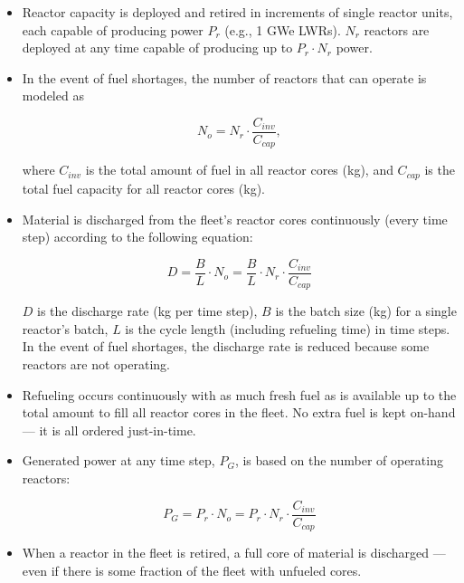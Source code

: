 \documentclass{style}
\begin{document}
\begin{itemize}

    \item Reactor capacity is deployed and retired in increments of single
      reactor units, each capable of producing power $P_r$ (e.g., 1 GWe
      LWRs).  $N_{r}$ reactors are deployed at any time capable of producing
      up to $P_r \cdot N_r$ power.

    \item In the event of fuel shortages, the number of reactors that can
      operate is modeled as

      \begin{equation}
        N_{o} = N_{r} \cdot \frac{C_{inv}}{C_{cap}},
        \label{eqn:operating-reactors}
      \end{equation}

       where $C_{inv}$ is the total amount of fuel in all reactor cores (kg),
       and $C_{cap}$ is the total fuel capacity for all reactor cores (kg).

    \item Material is discharged from the fleet's reactor cores continuously
        (every time step) according to the following equation:

        \begin{equation}
            D =
            \frac{B}{L} \cdot N_{o} =  \frac{B}{L} \cdot N_{r}\cdot \frac{C_{inv}}{C_{cap}}
            \label{eqn:fleet-discharge}
        \end{equation}

        $D$ is the discharge rate (kg per time step), $B$ is the batch size
        (kg) for a single reactor's batch, $L$ is the cycle length (including
        refueling time) in time steps.  In the event of fuel shortages, the
        discharge rate is reduced because some reactors are not operating.

    \item Refueling occurs continuously with as much fresh fuel as is
        available up to the total amount to fill all reactor cores in the
        fleet.  No extra fuel is kept on-hand --- it is all ordered
        just-in-time.

    \item Generated power at any time step, $P_G$, is based on the number of
      operating reactors:

      \begin{equation}
        P_{G} = P_r \cdot N_o = P_r \cdot N_r \cdot \frac{C_{inv}}{C_{cap}}
      \end{equation}

    \item When a reactor in the fleet is retired, a full core of material is
        discharged --- even if there is some fraction of the fleet with unfueled
        cores.
        
\end{itemize}
\end{document}
